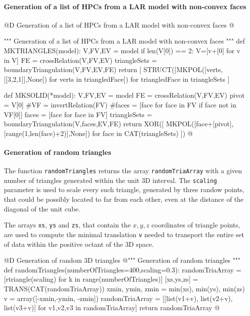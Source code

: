 \documentclass[11pt,oneside]{article}    %
\begin{document}
\paragraph{Generation of a list of HPCs from a LAR model with non-convex faces}

@D Generation of a list of HPCs from a LAR model with non-convex faces
@{""" Generation of a list of HPCs from a LAR model with non-convex faces """
def MKTRIANGLES(model): 
    V,FV,EV = model
    if len(V[0]) == 2: V=[v+[0] for v in V]
    FE = crossRelation(V,FV,EV)
    triangleSets = boundaryTriangulation(V,FV,EV,FE)
    return [ STRUCT([MKPOL([verts,[[3,2,1]],None]) for verts in triangledFace]) 
        for triangledFace in triangleSets ]

def MKSOLID(*model): 
    V,FV,EV = model
    FE = crossRelation(V,FV,EV)
    pivot = V[0]
    #VF = invertRelation(FV) 
    #faces = [face for face in FV if face not in VF[0]]
    faces = [face for face in FV]
    triangleSets = boundaryTriangulation(V,faces,EV,FE)
    return XOR([ MKPOL([face+[pivot], [range(1,len(face)+2)],None])
        for face in CAT(triangleSets) ])
@}


\paragraph{Generation of random triangles}
The function \texttt{randomTriangles} returns the array \texttt{randomTriaArray} with a given number of triangles generated within the unit 3D interval. The \texttt{scaling} parameter is used to scale every such triangle, generated by three randow points, that could be possibly located to far from each other, even at the distance of the diagonal of the unit cube.

The arrays \texttt{xs}, \texttt{ys} and \texttt{zs}, that contain the $x,y,z$ coordinates of triangle points, are used to compute the minimal translation \texttt{v} needed to transport the entire set of data within the positive octant of the 3D space. 

@D Generation of random 3D triangles
@{""" Generation of random triangles """
def randomTriangles(numberOfTriangles=400,scaling=0.3):
    randomTriaArray = [rtriangle(scaling) for k in range(numberOfTriangles)]
    [xs,ys,zs] = TRANS(CAT(randomTriaArray))
    xmin, ymin, zmin = min(xs), min(ys), min(zs)
    v = array([-xmin,-ymin, -zmin])
    randomTriaArray = [[list(v1+v), list(v2+v), list(v3+v)] for v1,v2,v3 in randomTriaArray]
    return randomTriaArray
@}
\end{document}
